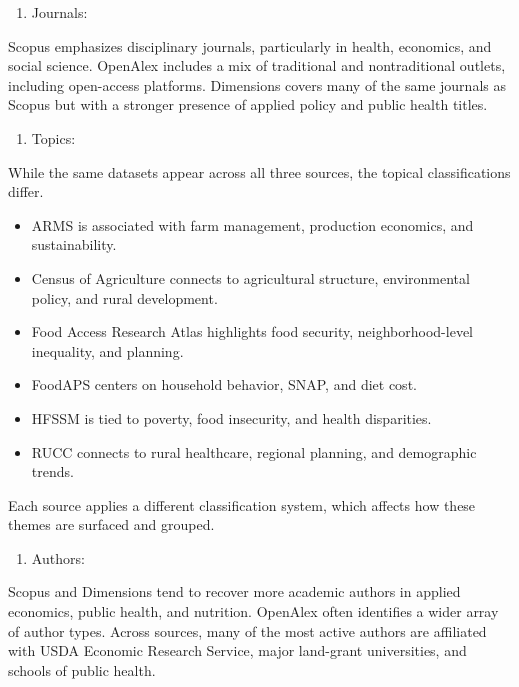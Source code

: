 \documentclass[
  letterpaper,
  DIV=11,
  numbers=noendperiod]{scrartcl}
\providecommand{\tightlist}{%
  \setlength{\itemsep}{0pt}\setlength{\parskip}{0pt}}\usepackage{longtable,booktabs,array}
\begin{document}
\begin{enumerate}
\def\labelenumi{\arabic{enumi}.}
\setcounter{enumi}{1}
\tightlist
\item
  Journals:
\end{enumerate}

Scopus emphasizes disciplinary journals, particularly in health,
economics, and social science. OpenAlex includes a mix of traditional
and nontraditional outlets, including open-access platforms. Dimensions
covers many of the same journals as Scopus but with a stronger presence
of applied policy and public health titles.

\begin{enumerate}
\def\labelenumi{\arabic{enumi}.}
\setcounter{enumi}{2}
\tightlist
\item
  Topics:
\end{enumerate}

While the same datasets appear across all three sources, the topical
classifications differ.

\begin{itemize}
\tightlist
\item
  ARMS is associated with farm management, production economics, and
  sustainability.
\item
  Census of Agriculture connects to agricultural structure,
  environmental policy, and rural development.
\item
  Food Access Research Atlas highlights food security,
  neighborhood-level inequality, and planning.
\item
  FoodAPS centers on household behavior, SNAP, and diet cost.
\item
  HFSSM is tied to poverty, food insecurity, and health disparities.
\item
  RUCC connects to rural healthcare, regional planning, and demographic
  trends.
\end{itemize}

Each source applies a different classification system, which affects how
these themes are surfaced and grouped.

\begin{enumerate}
\def\labelenumi{\arabic{enumi}.}
\setcounter{enumi}{3}
\tightlist
\item
  Authors:
\end{enumerate}

Scopus and Dimensions tend to recover more academic authors in applied
economics, public health, and nutrition. OpenAlex often identifies a
wider array of author types. Across sources, many of the most active
authors are affiliated with USDA Economic Research Service, major
land-grant universities, and schools of public health.
\end{document}
